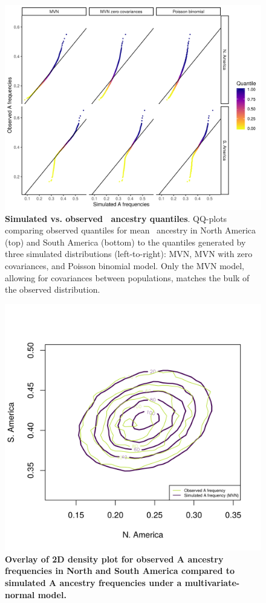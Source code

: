 \begin{figure}[ht]
\includegraphics[width=\textwidth]{chapter1/figures/qq_vs_data_sim_comparison.png}
\caption{ \textbf{Simulated vs. observed \A\ ancestry quantiles}. QQ-plots comparing observed quantiles for mean \A\ ancestry in North America (top) and South America (bottom) to the quantiles generated by three simulated distributions (left-to-right): MVN, MVN with zero covariances, and Poisson binomial model. Only the MVN model, allowing for covariances between populations, matches the bulk of the observed distribution.}
\label{qq_data_sims}
\end{figure}

\begin{figure}[ht]
\includegraphics[width=\textwidth]{chapter1/figures/comparison_2d_density_data_mvn.png}
\caption{ \textbf{Overlay of 2D density plot for observed A ancestry frequencies in North and South America compared to simulated A ancestry frequencies under a multivariate-normal model.}}
\label{density_data_mvn}
\end{figure}

